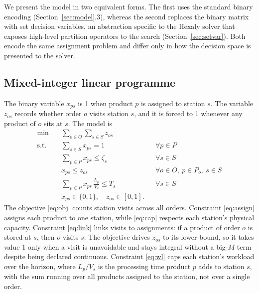 \documentclass[]{interact}
\begin{document}
We present the model in two equivalent forms. The first uses the standard binary encoding (Section~\ref{sec:model}.3), whereas the second replaces the binary matrix with set decision variables, an abstraction specific to the Hexaly solver \citep{blaisemodeling} that exposes high-level partition operators to the search (Section~\ref{sec:setvar}). Both encode the same assignment problem and differ only in how the decision space is presented to the solver.

\subsection{Mixed-integer linear programme}
The binary variable $x_{ps}$ is 1 when product $p$ is assigned to station $s$. The variable $z_{os}$ records whether order $o$ visits station $s$, and it is forced to 1 whenever any product of $o$ sits at $s$. The model is
\begin{align}
\min \quad & \sum_{o \in O} \sum_{s \in S} z_{os} \label{eq:obj}\\
\text{s.t.} \quad
& \sum_{s \in S} x_{ps} = 1 && \forall p \in P \label{eq:assign}\\
& \sum_{p \in P} x_{ps} \le \zeta_s && \forall s \in S \label{eq:cap}\\
& x_{ps} \le z_{os} && \forall o \in O,\ p \in P_o,\ s \in S \label{eq:link}\\
& \sum_{p \in P} x_{ps}\,\frac{L_p}{V_s} \le T_s && \forall s \in S \label{eq:wl}\\
& x_{ps} \in \{0,1\},\quad z_{os} \in [0,1]. && \label{eq:dom}
\end{align}
The objective \eqref{eq:obj} counts station visits across all orders. Constraint \eqref{eq:assign} assigns each product to one station, while \eqref{eq:cap} respects each station's physical capacity. Constraint \eqref{eq:link} links visits to assignments: if a product of order $o$ is stored at $s$, then $o$ visits $s$. The objective drives $z_{os}$ to its lower bound, so it takes value 1 only when a visit is unavoidable and stays integral without a big-$M$ term despite being declared continuous. Constraint \eqref{eq:wl} caps each station's workload over the horizon, where $L_p/V_s$ is the processing time product $p$ adds to station $s$, with the sum running over all products assigned to the station, not over a single order.
\end{document}

